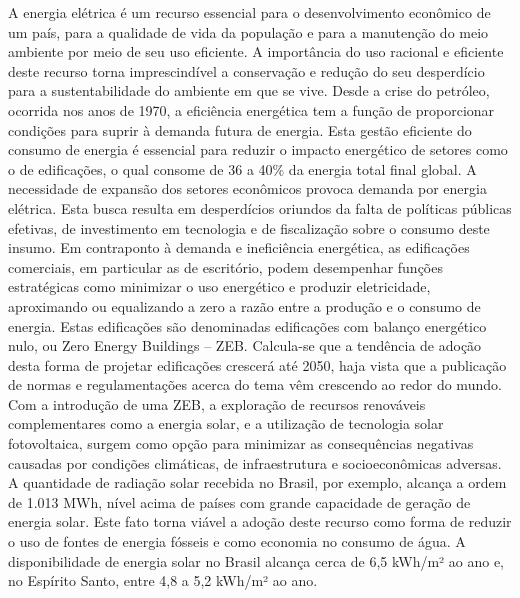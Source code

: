 \noindent A energia elétrica é um recurso essencial para o desenvolvimento econômico de 
um país, para a qualidade de vida da população e para a manutenção do meio ambiente
por meio de seu uso eficiente. A importância do uso racional e eficiente deste
recurso torna imprescindível a conservação e redução do seu desperdício para a 
sustentabilidade do ambiente em que se vive. Desde a crise do petróleo, ocorrida nos
anos de 1970, a eficiência energética tem a função de proporcionar condições para suprir à
demanda futura de energia. Esta gestão eficiente do consumo de energia é essencial para 
reduzir o impacto energético de setores como o de edificações, o qual consome de 36 a 40\% 
da energia total final global. A necessidade de expansão dos setores econômicos provoca demanda
por energia elétrica. Esta busca resulta em desperdícios oriundos da falta de políticas 
públicas efetivas, de investimento em tecnologia e de fiscalização sobre o consumo deste 
insumo. Em contraponto à demanda e ineficiência energética, as edificações comerciais, em 
particular as de escritório, podem desempenhar funções estratégicas como minimizar o uso 
energético e produzir eletricidade, aproximando ou equalizando a zero a razão entre a 
produção e o consumo de energia. Estas edificações são denominadas edificações com balanço 
energético nulo, ou Zero Energy Buildings – ZEB. Calcula-se que a tendência de adoção desta
forma de projetar edificações crescerá até 2050, haja vista que a publicação de normas e
regulamentações acerca do tema vêm crescendo ao redor do mundo. Com a introdução de uma ZEB,
a exploração de recursos renováveis complementares como a energia solar, e a utilização 
de tecnologia solar fotovoltaica, surgem como opção para minimizar as consequências 
negativas causadas por condições climáticas, de infraestrutura e socioeconômicas adversas.
A quantidade de radiação solar recebida no Brasil, por exemplo, alcança a ordem de 
1.013 MWh, nível acima de países com grande capacidade de geração de energia solar. 
Este fato torna viável a adoção deste recurso como forma de reduzir o uso de fontes de 
energia fósseis e como economia no consumo de água. A disponibilidade de energia solar 
no Brasil alcança cerca de 6,5 kWh/m² ao ano e, no Espírito Santo, entre 4,8 a
5,2 kWh/m² ao ano.
